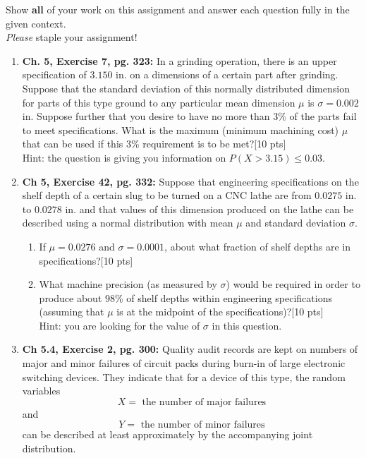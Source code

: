 \documentclass[11pt]{article}\usepackage[]{graphicx}\usepackage[]{color}
\begin{document}

\pagestyle{fancy} 

Show \textbf{all} of your work on this assignment and answer each question fully in the given context. \\


\emph{Please} staple your assignment!


\begin{enumerate}
	
    \item \textbf{Ch. 5, Exercise 7, pg. 323:} In a grinding operation, there is an upper specification of $3.150$ in. on a dimensions of a certain part after grinding. Suppose that the standard deviation of this normally distributed dimension for parts of this type ground to any particular mean dimension $\mu$ is $\sigma = 0.002$ in. Suppose further that you desire to have no more than $3\%$ of the parts fail to meet specifications. What is the maximum (minimum machining cost) $\mu$ that can be used if this $3$\% requirement is to be met?[10 pts]\\
    Hint: the question is giving you information on $P(X> 3.15)\leq 0.03$.
    
    \item \textbf{Ch 5, Exercise 42, pg. 332:} Suppose that engineering specifications on the shelf depth of a certain slug to be turned on a CNC lathe are from $0.0275$ in. to $0.0278$ in. and that values of this dimension produced on the lathe can be described using a normal distribution with mean $\mu$ and standard deviation $\sigma$.
        \begin{enumerate}
              \item If $\mu = 0.0276$ and $\sigma = 0.0001$, about what fraction of shelf depths are in specifications?[10 pts]
              
              \item What machine precision (as measured by $\sigma$) would be required in order to produce about $98$\% of shelf depths within engineering specifications (assuming that $\mu$ is at the midpoint of the specifications)?[10 pts]\\
              Hint: you are looking for the value of $\sigma$ in this question.
        \end{enumerate}
 \item \textbf{Ch 5.4, Exercise 2, pg. 300:} Quality audit records are kept on numbers of major and minor failures of circuit packs during burn-in of large electronic switching devices. They indicate that for a device of this type, the random variables
    $$
    X = \text{ the number of major failures}
    $$
    and
    $$
    Y = \text{ the number of minor failures}
    $$
    can be described at least approximately by the accompanying joint distribution.




\end{enumerate}
\end{document}
